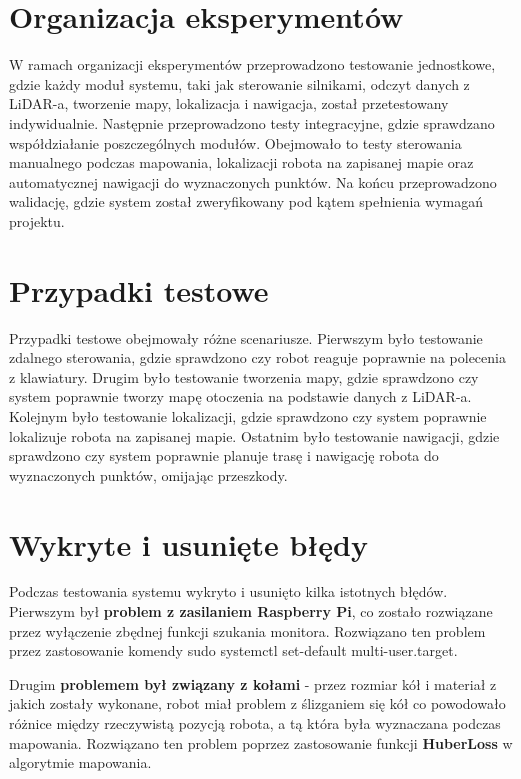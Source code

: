 \documentclass[a4paper,twoside,12pt]{book}
\begin{document}
\section{Organizacja eksperymentów}

W ramach organizacji eksperymentów przeprowadzono testowanie jednostkowe, gdzie każdy moduł systemu, taki jak sterowanie silnikami, odczyt danych z LiDAR-a, tworzenie mapy, lokalizacja i nawigacja, został przetestowany indywidualnie. 
Następnie przeprowadzono testy integracyjne, gdzie sprawdzano współdziałanie poszczególnych modułów. Obejmowało to testy sterowania manualnego podczas mapowania, lokalizacji robota na zapisanej mapie oraz automatycznej nawigacji do wyznaczonych punktów.
Na końcu przeprowadzono walidację, gdzie system został zweryfikowany pod kątem spełnienia wymagań projektu.

\section{Przypadki testowe}

Przypadki testowe obejmowały różne scenariusze. Pierwszym było testowanie zdalnego sterowania, gdzie sprawdzono czy robot reaguje poprawnie na polecenia z klawiatury. Drugim było testowanie tworzenia mapy, gdzie sprawdzono czy system poprawnie tworzy mapę otoczenia na podstawie danych z LiDAR-a. Kolejnym było testowanie lokalizacji, gdzie sprawdzono czy system poprawnie lokalizuje robota na zapisanej mapie. Ostatnim było testowanie nawigacji, gdzie sprawdzono czy system poprawnie planuje trasę i nawigację robota do wyznaczonych punktów, omijając przeszkody.


\section{Wykryte i usunięte błędy}

Podczas testowania systemu wykryto i usunięto kilka istotnych błędów. Pierwszym był \textbf{problem z zasilaniem Raspberry Pi}, co zostało rozwiązane przez wyłączenie zbędnej funkcji szukania monitora. Rozwiązano ten problem przez zastosowanie komendy sudo systemctl set-default multi-user.target.

Drugim \textbf{problemem był związany z kołami} - przez rozmiar kół i materiał z jakich zostały wykonane, robot miał problem z ślizganiem się kół co powodowało różnice między rzeczywistą pozycją robota, a tą która była wyznaczana podczas mapowania. Rozwiązano ten problem poprzez zastosowanie funkcji \textbf{HuberLoss} w algorytmie mapowania.
\end{document}
